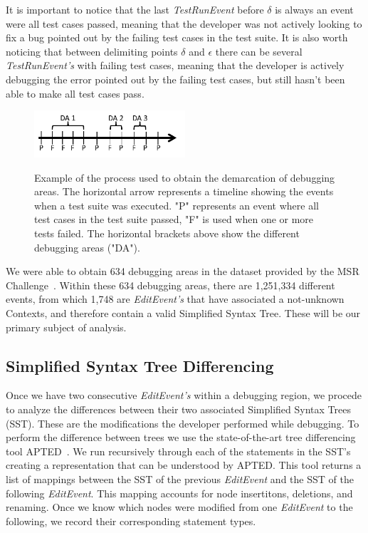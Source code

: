 \documentclass[sigconf]{acmart}
\begin{document}
It is important to notice that the last \textit{TestRunEvent} before $\delta$ 
is always an event were all test cases passed, meaning that the
developer was not actively looking to fix a bug pointed out by the
failing test cases in the test suite. It is also worth noticing
that between delimiting points $\delta$ and $\epsilon$ there can be 
several \textit{TestRunEvent's} with failing test cases, meaning
that the developer is actively debugging the error pointed out
by the failing test cases, but still hasn't been able to make
all test cases pass.

\begin{figure}[h]
\caption{Example of the process used to obtain the demarcation of
debugging areas. The horizontal arrow represents a timeline showing
the events when a test suite was executed. "P" 
represents an event where all test cases in the test suite
passed, "F" is used when one or more tests failed. The horizontal brackets
above show the different debugging areas ("DA").}
\centering
\includegraphics[width=0.5\textwidth]{images/demarcations.png}
\label{demarcations}
\end{figure}

We were able to obtain 634 debugging areas in the dataset 
provided by the MSR Challenge~\cite{msr18challenge}.
Within these 634 debugging areas, there are 1,251,334
different events, from which 1,748 are \textit{EditEvent's}
that have associated a not-unknown Contexts, and therefore 
contain a valid Simplified Syntax Tree. These will be 
our primary subject of analysis.

\subsection{Simplified Syntax Tree Differencing}
\label{sstDiff}
Once we have two consecutive \textit{EditEvent's} within
a debugging region, we procede to analyze the differences
between their two associated Simplified Syntax Trees (SST).
These are the modifications the developer performed
while debugging.
To perform the difference between trees we use the 
state-of-the-art tree differencing
tool APTED~\cite{Pawlik16Apted}.
We run recursively through each of the statements in the 
SST's creating a representation that can be understood by
APTED. This tool returns a list of mappings between
the SST of the previous \textit{EditEvent} and the SST
of the following \textit{EditEvent}. This mapping
accounts for node insertitons, deletions, and renaming.
Once we know which nodes were modified from one \textit{EditEvent}
to the following, we record their corresponding statement types.
\end{document}
